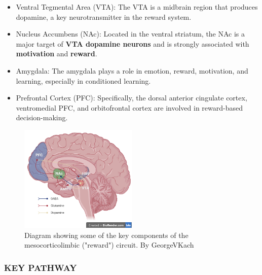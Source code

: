 \documentclass{book}
\begin{document}
\begin{itemize}
    \item Ventral Tegmental Area (VTA): The VTA is a midbrain region that produces dopamine, a key neurotransmitter in the reward system. 
    \item Nucleus Accumbens (NAc): Located in the ventral striatum, the NAc is a major target of \textbf{VTA dopamine neurons} and is strongly associated with \textbf{motivation} and \textbf{reward}. 
    \item Amygdala: The amygdala plays a role in emotion, reward, motivation, and learning, especially in conditioned learning. 
    \item Prefrontal Cortex (PFC): Specifically, the dorsal anterior cingulate cortex, ventromedial PFC, and orbitofrontal cortex are involved in reward-based decision-making. 
\end{itemize}

\begin{figure}
    \centering
    \includegraphics[width=0.5\textwidth]{images3/image7.png}
    \caption{\label{fig:RS}Diagram showing some of the key components of the mesocorticolimbic ("reward") circuit. By GeorgeVKach}
\end{figure}

\subsubsection{KEY PATHWAY}
\end{document}
